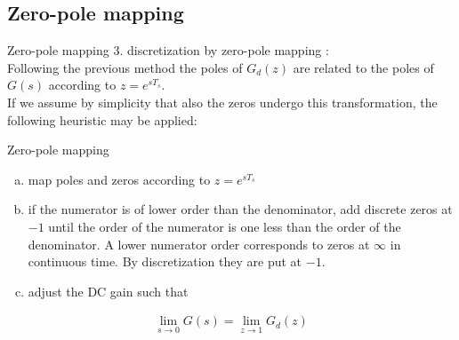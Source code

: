 \subsection{Zero-pole mapping}
\begin{frame}{Zero-pole mapping}
3. discretization by zero-pole mapping :\\
\vspace{0.6cm}
Following the previous method the poles of $G_d(z)$ are
related to the poles of $G(s)$ according to $z=e^{sT_s}$.\\
\vspace{0.3cm}
If we assume by simplicity that also the zeros undergo this
transformation, the following heuristic may be applied:
\end{frame}

\begin{frame}{Zero-pole mapping}
\begin{enumerate}[(a)]
\item map poles and zeros according to $z=e^{sT_s}$
\item if the numerator is of lower order than the denominator,
add discrete zeros at $-1$ until the order of the
numerator is one less than the order of the denominator.
A lower numerator order corresponds to zeros
at $\infty$ in continuous time. By discretization they are
put at $-1$.

\item adjust the DC gain such that
\end{enumerate}
\begin{align*}
    \lim_{s\to0}G(s)=\lim_{z\to1}G_d(z)
\end{align*}

\end{frame}

